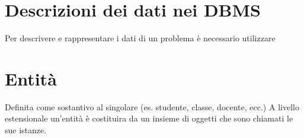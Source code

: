 \section{Descrizioni dei dati nei DBMS}
Per descrivere e rappresentare i dati di un problema è necessario utilizzare 

\section{Entità}
Definita come sostantivo al singolare (es. studente, classe, docente, ecc.)
A livello estensionale un'entità è costituira da un insieme di oggetti che sono chiamati le sue istanze.